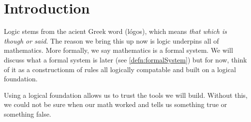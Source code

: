 \section{Introduction}

Logic stems from the acient Greek word  (l\'{o}gos), which means \emph{that which is though or said}.
The reason we bring this up now is logic underpins all of mathematics.
More formally, we say mathematics is a formal system.
We will discuss what a formal system is later (see \ref{defn:formalSystem}) but for now, think of it as a constructionm of rules all logically compatable and built on a logical foundation.

Using a logical foundation allows us to trust the tools we will build.
Without this, we could not be sure when our math worked and tells us something true or something false.









